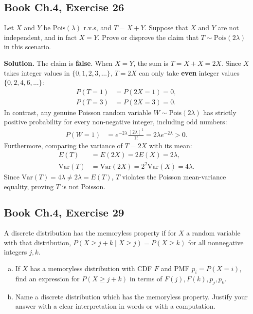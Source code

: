 \documentclass[11pt,a4paper]{article}
\begin{document}
\vspace{10pt}
\subsection{Book Ch.4, Exercise 26}
\begin{tcolorbox}[title={Book Ch.4, Exercise 26}]
Let $X$ and $Y$ be $\text{Pois}(\lambda)$ r.v.s, and $T = X + Y$. Suppose that $X$ and $Y$ are not independent, and in fact $X = Y$. Prove or disprove the claim that $T \sim \text{Pois}(2\lambda)$ in this scenario.
\end{tcolorbox}

\noindent \textbf{Solution.} The claim is \textbf{false}. When $X = Y$, the sum is $T = X + X = 2X$. Since $X$ takes integer values in $\{0, 1, 2, 3, \dots\}$, $T = 2X$ can only take \textbf{even} integer values $\{0, 2, 4, 6, \dots\}$:
\begin{align*}
P(T = 1) &= P(2X = 1) = 0, \\
P(T = 3) &= P(2X = 3) = 0.
\end{align*}
In contrast, any genuine Poisson random variable $W \sim \text{Pois}(2\lambda)$ has strictly positive probability for every non-negative integer, including odd numbers:
\begin{align*}
P(W = 1) &= e^{-2\lambda} \frac{(2\lambda)^1}{1!} = 2\lambda e^{-2\lambda} > 0.
\end{align*}
Furthermore, comparing the variance of $T = 2X$ with its mean:
\begin{align*}
E(T) &= E(2X) = 2 E(X) = 2\lambda, \\
\text{Var}(T) &= \text{Var}(2X) = 2^2 \text{Var}(X) = 4\lambda.
\end{align*}
Since $\text{Var}(T) = 4\lambda \neq 2\lambda = E(T)$, $T$ violates the Poisson mean-variance equality, proving $T$ is not Poisson.

\vspace{10pt}
\subsection{Book Ch.4, Exercise 29}
\begin{tcolorbox}[title={Book Ch.4, Exercise 29}]
A discrete distribution has the memoryless property if for $X$ a random variable with that distribution, $P(X \ge j + k \mid X \ge j) = P(X \ge k)$ for all nonnegative integers $j, k$.
\begin{enumerate}[(a)]
\item If $X$ has a memoryless distribution with CDF $F$ and PMF $p_i = P(X = i)$, find an expression for $P(X \ge j + k)$ in terms of $F(j), F(k), p_j, p_k$.
\item Name a discrete distribution which has the memoryless property. Justify your answer with a clear interpretation in words or with a computation.
\end{enumerate}
\end{tcolorbox}
\end{document}
